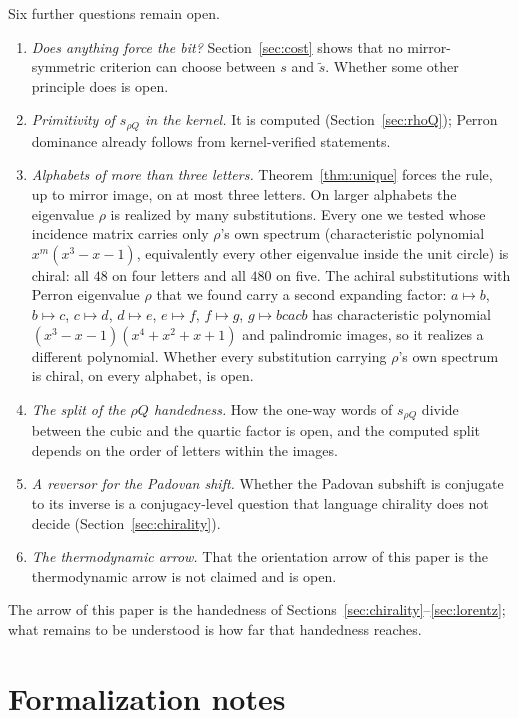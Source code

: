 \documentclass[11pt]{amsart}
\theoremstyle{plain}
\theoremstyle{definition}
\theoremstyle{remark}
\begin{document}
Six further questions remain open.\nopagebreak
\begin{enumerate}
\item \emph{Does anything force the bit?} Section~\ref{sec:cost} shows that no mirror-symmetric criterion can choose between $s$ and $\tilde s$. Whether some other principle does is open.
\item \emph{Primitivity of $s_{\rho Q}$ in the kernel.} It is computed (Section~\ref{sec:rhoQ}); Perron dominance already follows from kernel-verified statements.
\item \emph{Alphabets of more than three letters.} Theorem~\ref{thm:unique} forces the rule, up to mirror image, on at most three letters. On larger alphabets the eigenvalue $\rho$ is realized by many substitutions. Every one we tested whose incidence matrix carries only $\rho$'s own spectrum (characteristic polynomial $x^m(x^3-x-1)$, equivalently every other eigenvalue inside the unit circle) is chiral: all $48$ on four letters and all $480$ on five. The achiral substitutions with Perron eigenvalue $\rho$ that we found carry a second expanding factor: $a \mapsto b$, $b \mapsto c$, $c \mapsto d$, $d \mapsto e$, $e \mapsto f$, $f \mapsto g$, $g \mapsto bcacb$ has characteristic polynomial $(x^3-x-1)(x^4+x^2+x+1)$ and palindromic images, so it realizes a different polynomial. Whether every substitution carrying $\rho$'s own spectrum is chiral, on every alphabet, is open.
\item \emph{The split of the $\rho Q$ handedness.} How the one-way words of $s_{\rho Q}$ divide between the cubic and the quartic factor is open, and the computed split depends on the order of letters within the images.
\item \emph{A reversor for the Padovan shift.} Whether the Padovan subshift is conjugate to its inverse is a conjugacy-level question that language chirality does not decide (Section~\ref{sec:chirality}).
\item \emph{The thermodynamic arrow.} That the orientation arrow of this paper is the thermodynamic arrow is not claimed and is open.
\end{enumerate}
The arrow of this paper is the handedness of Sections~\ref{sec:chirality}--\ref{sec:lorentz}; what remains to be understood is how far that handedness reaches.

\section{Formalization notes}
\label{sec:formalization}
\end{document}
